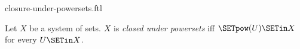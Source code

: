 \documentclass{stex}
\begin{document}
\begin{smodule}{closure-under-powersets.ftl}

\begin{definition}[forthel,id=FOUNDATIONS_14_4652013578120594]
  Let $X$ be a system of sets.
  $X$ is \emph{closed under powersets} iff $\SETpow(U) \SETin X$ for every $U \SETin X$.
\end{definition}
\end{smodule}
\end{document}
